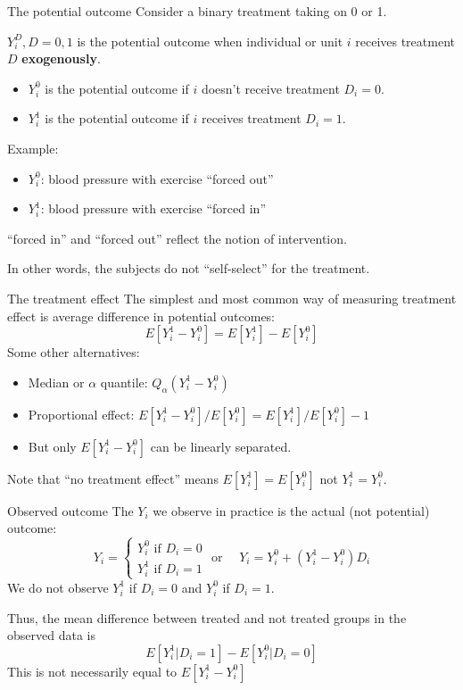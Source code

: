 \documentclass{beamer}
\begin{document}
\begin{frame}{The potential outcome}
Consider a binary treatment taking on 0 or 1.\bigskip

$Y_i^D , D=0,1$ is the potential outcome when individual or unit $i$ receives treatment $D$ \textbf{\color{red}exogenously}.
\begin{itemize}
\item $Y_i^0$ is the potential outcome if $i$ doesn't receive treatment $D_i=0$.
\item $Y_i^1$ is the potential outcome if $i$ receives treatment $D_i=1$.
\end{itemize}\bigskip

Example:\begin{itemize}
\item $Y_i^0$: blood pressure with exercise ``forced out''
\item $Y_i^1$: blood pressure with exercise ``forced in''

\end{itemize}

``forced in'' and ``forced out'' reflect the notion of intervention.\medskip

In other words, the subjects do not ``self-select'' for the treatment.


\end{frame}

\begin{frame}{The treatment effect}
The simplest and most common way of measuring treatment effect \pause is average difference in potential outcomes:
\[E[Y_i^1-Y_i^0]=E[Y_i^1]-E[Y_i^0]\]\pause
Some other alternatives:
\begin{itemize}
\item Median or $\alpha$ quantile: $Q_\alpha(Y_i^1-Y_i^0)$
\item Proportional effect: $E[Y_i^1-Y_i^0]/E[Y_i^0]=E[Y_i^1]/E[Y_i^0]-1$
\item But only $E[Y_i^1-Y_i^0]$ can be linearly separated.
\end{itemize}\bigskip

Note that ``no treatment effect'' means $E[Y_i^1]=E[Y_i^0]$ not $Y_i^1=Y_i^0$.

\end{frame}

\begin{frame}{Observed outcome}
The $Y_i$ we observe in practice is the actual (not potential) outcome:
\[Y_i=\begin{cases} 
Y_i^0\text{ if }D_i=0\\
Y_i^1\text{ if }D_i=1
\end{cases} \text{ or } \quad Y_i=Y_i^0+(Y_i^1-Y_i^0)D_i \]\pause
We do not observe $Y_i^1$ if $D_i=0$ and $Y_i^0$ if $D_i=1$.\bigskip\pause

Thus, the mean difference between treated and not treated groups in the observed data is
\[ E[Y_i^1|D_i=1]-E[Y_i^0|D_i=0] \]
This is not necessarily equal to $E[Y_i^1-Y_i^0]$

\end{frame}
\end{document}
